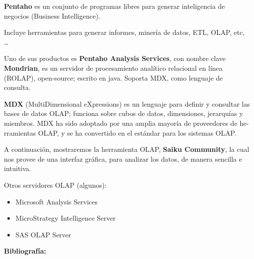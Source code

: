 \documentclass{fancyslides}
\begin{document}
\begin{frame}
\end{frame}

\begin{frame}
\misc
{
\justifying \textbf{Pentaho} es un conjunto de programas libres para generar inteligencia de negocios (Business
Intelligence).

\justifying Incluye herramientas para generar informes, minería de datos, ETL, OLAP, etc, \dots

\justifying Uno de sus productos es \textbf{Pentaho Analysis Services}, con nombre clave \textbf{Mondrian}, es un servidor de procesamiento analítico relacional en línea (ROLAP), open-source; escrito en java.
Soporta MDX, como lenguaje de consulta.
\newline

\justifying \textbf{MDX} (MultiDimensional eXpressions) es un lenguaje para definir y consultar las bases de datos OLAP; funciona sobre cubos de datos, dimensiones, jerarquías y miembros.
MDX ha sido adoptado por una amplia mayoría de proveedores de he-rramientas OLAP, y se ha convertido en el estándar para los sistemas OLAP.

}
\end{frame}

\begin{frame}
\misc
{
\justifying A continuación, mostraremos la herramienta OLAP, \textbf{Saiku Community}, la cual nos provee de una interfaz gráfica, para analizar
los datos, de manera sencilla e intuitiva.
\newline

Otros servidores OLAP (algunos):

\begin{itemize}
  \item Microsoft Analysis Services
  \item MicroStrategy Intelligence Server
  \item SAS OLAP Server
\end{itemize}

}
\end{frame}


\begin{frame}
\misc
{ \textbf{Bibliografía:}

\printbibliography
}
\end{frame}
\end{document}
